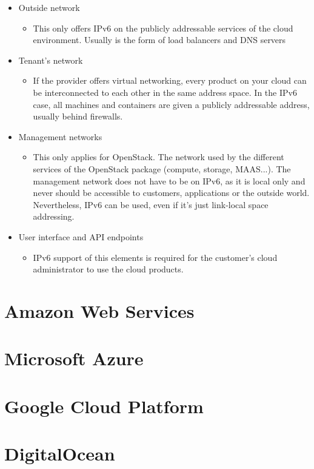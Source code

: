 \begin{itemize}
	\item Outside network
	\begin{itemize}
		\item This only offers IPv6 on the publicly addressable services of the cloud environment. Usually is the form of load balancers and DNS servers
	\end{itemize}
	\item Tenant's network
	\begin{itemize}
		\item If the provider offers virtual networking, every product on your cloud can be interconnected to each other in the same address space. In the IPv6 case, all machines and containers are given a publicly addressable address, usually behind firewalls.
	\end{itemize}
	\item Management networks
	\begin{itemize}
		\item This only applies for OpenStack. The network used by the different services of the OpenStack package (compute, storage, MAAS...). The management network does not have to be on IPv6, as it is local only and never should be accessible to customers, applications or the outside world. Nevertheless, IPv6 can be used, even if it's just link-local space addressing.
		
	\end{itemize}
	\item User interface and API endpoints
	\begin{itemize}
		\item IPv6 support of this elements is required for the customer's cloud administrator to use the cloud products. 
	\end{itemize}
\end{itemize}

\section{Amazon Web Services}


\section{Microsoft Azure}

\section{Google Cloud Platform}

\section{DigitalOcean}
